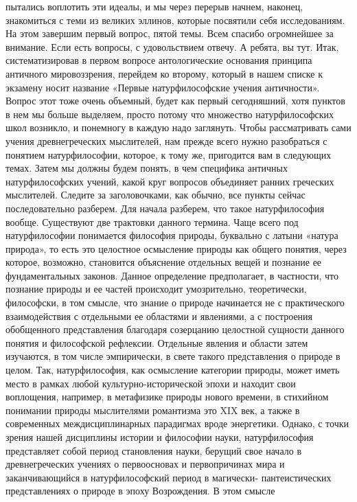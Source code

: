 пытались воплотить эти идеалы, и мы через перерыв начнем, наконец, знакомиться с
теми из великих эллинов, которые посвятили себя исследованиям. На этом завершим
первый вопрос, пятой темы. Всем спасибо огромнейшее за внимание. Если есть
вопросы, с удовольствием отвечу. А ребята, вы тут. Итак, систематизировав в
первом вопросе антологические основания принципа античного мировоззрения,
перейдем ко второму, который в нашем списке к экзамену носит название «Первые
натурфилософские учения античности». Вопрос этот тоже очень объемный, будет как
первый сегодняшний, хотя пунктов в нем мы больше выделяем, просто потому что
множество натурфилософских школ возникло, и понемногу в каждую надо заглянуть.
Чтобы рассматривать сами учения древнегреческих мыслителей, нам прежде всего
нужно разобраться с понятием натурфилософии, которое, к тому же, пригодится вам
в следующих темах. Затем мы должны будем понять, в чем специфика античных
натурфилософских учений, какой круг вопросов объединяет ранних греческих
мыслителей. Следите за заголовочками, как обычно, все пункты сейчас
последовательно разберем. Для начала разберем, что такое натурфилософия вообще.
Существуют две трактовки данного термина. Чаще всего под натурфилософии
понимается философия природы, буквально с латыни «натура природа», то есть это
целостное осмысление природы как общего понятия, через которое, возможно,
становится объяснение отдельных вещей и познание ее фундаментальных законов.
Данное определение предполагает, в частности, что познание природы и ее частей
происходит умозрительно, теоретически, философски, в том смысле, что знание о
природе начинается не с практического взаимодействия с отдельными ее областями и
явлениями, а с построения обобщенного представления благодаря созерцанию
целостной сущности данного понятия и философской рефлексии. Отдельные явления и
области затем изучаются, в том числе эмпирически, в свете такого представления о
природе в целом. Так, натурфилософия, как осмысление категории природы, может
иметь место в рамках любой культурно-исторической эпохи и находит свои
воплощения, например, в метафизике природы нового времени, в стихийном понимании
природы мыслителями романтизма это XIX век, а также в современных
междисциплинарных парадигмах вроде энергетики. Однако, с точки зрения нашей
дисциплины истории и философии науки, натурфилософия представляет собой период
становления науки, берущий свое начало в древнегреческих учениях о первоосновах
и первопричинах мира и заканчивающийся в натурфилософский период в магически-
пантеистических представлениях о природе в эпоху Возрождения. В этом смысле
